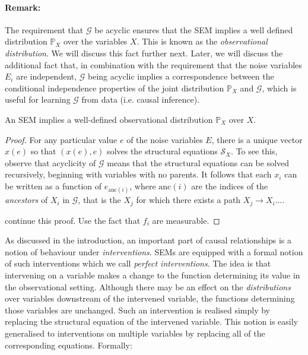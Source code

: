\paragraph{Remark:}
The requirement that $\mathcal{G}$ be acyclic ensures that the SEM implies a well defined distribution $\mathbb{P}_X$ over the variables $X$. This is known as the \emph{observational distribution}. We will discuss this fact further next. Later, we will discuss the additional fact that, in combination with the requirement that the noise variables $E_i$ are independent, $\mathcal{G}$ being acyclic implies a correspondence between the conditional independence properties of the joint distribution $\mathbb{P}_X$ and $\mathcal{G}$, which is useful for learning $\mathcal{G}$ from data (i.e. causal inference). 

\begin{lemma}
An SEM implies a well-defined observational distribution $\mathbb{P}_X$ over $X$.
\end{lemma}
\begin{proof}
For any particular value $e$ of the noise variables $E$, there is a unique vector $x(e)$ so that $(x(e), e)$ solves the structural equations $\mathcal{S}_X$. To see this, observe that acyclicity of $\mathcal{G}$ means that the structural equations can be solved recursively, beginning with variables with no parents. It follows that each $x_i$ can be written as a function of $e_{\text{anc}(i)}$, where $\text{anc}(i)$ are the indices of the \emph{ancestors} of $X_i$ in $\mathcal{G}$, that is the $X_j$ for which there exists a path $X_j \to X_i$....

continue this proof. Use the fact that $f_i$ are measurable.
\end{proof}

As discussed in the introduction, an important part of causal relationships is a notion of behaviour under \emph{interventions}. SEMs are equipped with a formal notion of such interventions which we call \emph{perfect interventions}. The idea is that intervening on a variable makes a change to the function determining its value in the observational setting.  Although there may be an effect on the \emph{distributions} over variables downstream of the intervened variable, the functions determining those variables are unchanged. Such an intervention is realised simply by replacing the structural equation of the intervened variable. This notion is easily generalised to interventions on multiple variables by replacing all of the corresponding equations. Formally:

